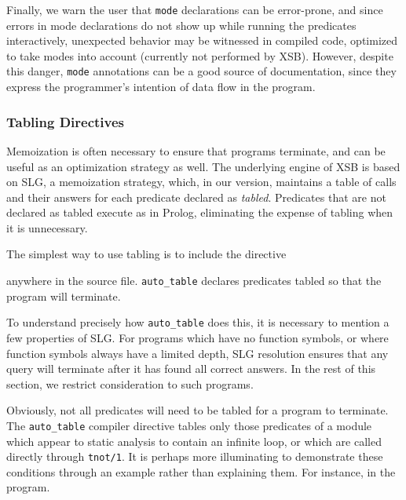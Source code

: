 Finally, we warn the user that {\tt mode} declarations can be error-prone,
and since errors in mode declarations do not show up while running the
predicates interactively, unexpected behavior may be witnessed in compiled
code, optimized to take modes into account (currently not performed by
XSB)\@.  However, despite this danger, {\tt mode} annotations can be
a good source of documentation, since they express the programmer's
intention of data flow in the program.


\subsubsection{Tabling Directives}\label{tabling_directives}
Memoization is often necessary to ensure that programs terminate, and
can be useful as an optimization strategy as well.  The underlying
engine of XSB is based on SLG, a memoization strategy, which,
in our version, maintains a table of calls and their answers for each
predicate declared as {\em tabled}.  Predicates that are not declared
as tabled execute as in Prolog, eliminating the expense of tabling
when it is unnecessary.

The simplest way to use tabling is to include the directive


\noindent
anywhere in the source file.  {\tt auto\_table} declares predicates
tabled so that the program will terminate.

To understand precisely how {\tt auto\_table} does this, it is
necessary to mention a few properties of SLG.  For programs which have
no function symbols, or where function symbols always have a limited
depth, SLG resolution ensures that any query will terminate after it
has found all correct answers.  In the rest of this section, we
restrict consideration to such programs.

Obviously, not all predicates will need to be tabled for a program to
terminate.  The {\tt auto\_table} compiler directive tables only those
predicates of a module which appear to static analysis to contain an
infinite loop, or which are called directly through {\tt tnot/1}.  It
is perhaps more illuminating to demonstrate these conditions through
an example rather than explaining them.  For instance, in the program.

